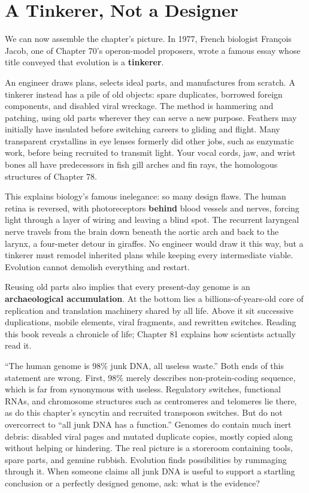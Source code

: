 \section{A Tinkerer, Not a Designer}

We can now assemble the chapter's picture. In 1977, French biologist François Jacob, one of Chapter 70's operon-model proposers, wrote a famous essay whose title conveyed that evolution is a \textbf{tinkerer}.

An engineer draws plans, selects ideal parts, and manufactures from scratch. A tinkerer instead has a pile of old objects: spare duplicates, borrowed foreign components, and disabled viral wreckage. The method is hammering and patching, using old parts wherever they can serve a new purpose. Feathers may initially have insulated before switching careers to gliding and flight. Many transparent crystallins in eye lenses formerly did other jobs, such as enzymatic work, before being recruited to transmit light. Your vocal cords, jaw, and wrist bones all have predecessors in fish gill arches and fin rays, the homologous structures of Chapter 78.

This explains biology's famous inelegance: so many design flaws. The human retina is reversed, with photoreceptors \textbf{behind} blood vessels and nerves, forcing light through a layer of wiring and leaving a blind spot. The recurrent laryngeal nerve travels from the brain down beneath the aortic arch and back to the larynx, a four-meter detour in giraffes. No engineer would draw it this way, but a tinkerer must remodel inherited plans while keeping every intermediate viable. Evolution cannot demolish everything and restart.

Reusing old parts also implies that every present-day genome is an \textbf{archaeological accumulation}. At the bottom lies a billions-of-years-old core of replication and translation machinery shared by all life. Above it sit successive duplications, mobile elements, viral fragments, and rewritten switches. Reading this book reveals a chronicle of life; Chapter 81 explains how scientists actually read it.

\begin{wuqu}
``The human genome is 98\% junk DNA, all useless waste.'' Both ends of this statement are wrong. First, 98\% merely describes non-protein-coding sequence, which is far from synonymous with useless. Regulatory switches, functional RNAs, and chromosome structures such as centromeres and telomeres lie there, as do this chapter's syncytin and recruited transposon switches. But do not overcorrect to ``all junk DNA has a function.'' Genomes do contain much inert debris: disabled viral pages and mutated duplicate copies, mostly copied along without helping or hindering. The real picture is a storeroom containing tools, spare parts, and genuine rubbish. Evolution finds possibilities by rummaging through it. When someone claims all junk DNA is useful to support a startling conclusion or a perfectly designed genome, ask: what is the evidence?
\end{wuqu}

